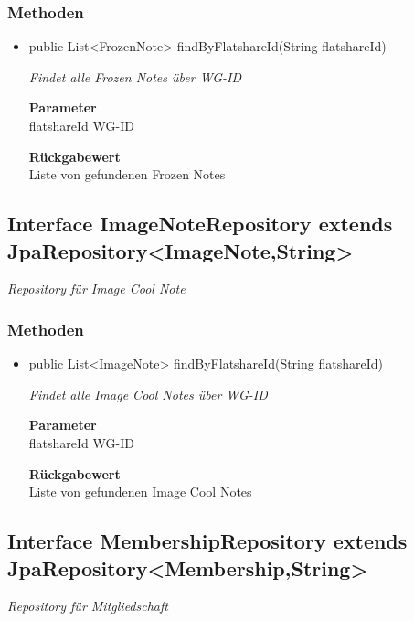 \documentclass[a4paper]{scrreprt}
\begin{document}
        \subsubsection{Methoden}
        \begin{itemize}
        	\item{public List<FrozenNote> findByFlatshareId(String flatshareId)}
        	
        	\textit{Findet alle Frozen Notes über WG-ID}
        	
        	\textbf{Parameter} \\
        	flatshareId WG-ID
        	
        	\textbf{Rückgabewert} \\
        	Liste von gefundenen Frozen Notes
        \end{itemize}
        \subsection{Interface ImageNoteRepository extends JpaRepository<ImageNote,String>}
        \textit{Repository für Image Cool Note}
        \subsubsection{Methoden}
        \begin{itemize}
        	\item{public List<ImageNote> findByFlatshareId(String flatshareId)}
        	
        	\textit{Findet alle Image Cool Notes über WG-ID}
        	
        	\textbf{Parameter} \\
        	flatshareId WG-ID
        	
        	\textbf{Rückgabewert} \\
        	Liste von gefundenen Image Cool Notes
        \end{itemize}
        \subsection{Interface MembershipRepository extends JpaRepository<Membership,String>}
        \textit{Repository für Mitgliedschaft}
\end{document}
